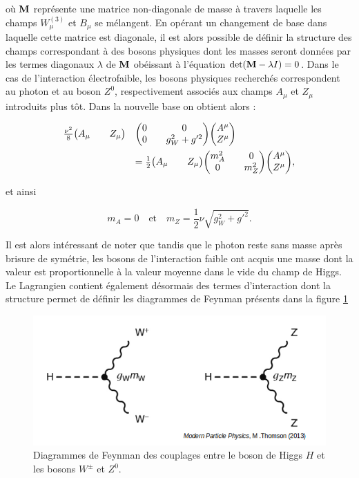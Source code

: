         où $\vb{M}$ représente une matrice non-diagonale de masse à travers laquelle les champs $W_{\mu}^{(3)}$ et $B_{\mu}$ se mélangent. En opérant un changement de base dans laquelle cette matrice est diagonale, il est alors possible de définir la structure des champs correspondant à des bosons physiques dont les masses seront données par les termes diagonaux $\lambda$ de $\vb{M}$ obéissant à l'équation $\det(\vb{M}-\lambda I)=0$. Dans le cas de l'interaction électrofaible, les bosons physiques recherchés correspondent au photon et au boson $Z^0$, respectivement associés aux champs $A_{\mu}$ et $Z_{\mu}$ introduits plus tôt. Dans la nouvelle base on obtient alors :

        \begin{equation*}
        \begin{array}{ll}
            \frac{\nu^2}{8}\mqty(A_{\mu}&&Z_{\mu})&\mqty(0&&0\\0&&g^2_W+g'^2)\mqty(A^{\mu}\\Z^{\mu}) \vspace{5pt} \\
            &=\frac{1}{2}\mqty(A_{\mu}&&Z_{\mu})\mqty(m_A^2&&0\\0&&m_Z^2)\mqty(A^{\mu}\\Z^{\mu}),
        \end{array}
        \end{equation*}    

        et ainsi 

        \begin{equation}
            \boxed{
            m_A=0 \quad \mbox{et} \quad m_Z=\frac{1}{2}\nu\sqrt{g^2_W+g'^2}.
            }
        \end{equation}

        Il est alors intéressant de noter que tandis que le photon reste sans masse après brisure de symétrie, les bosons de l'interaction faible ont acquis une masse dont la valeur est proportionnelle à la valeur moyenne dans le vide du champ de Higgs. Le Lagrangien contient également désormais des termes d'interaction dont la structure permet de définir les diagrammes de Feynman présents dans la figure \ref{higgsVcoupling}

        \begin{figure}
        \centering
            \includegraphics[scale=0.45]{Chapitre2/Images/higgsVcoupling.png} 
            \caption{Diagrammes de Feynman des couplages entre le boson de Higgs $H$ et les bosons $W^{\pm}$ et $Z^0$.}
        \label{higgsVcoupling}
        \end{figure}
        
